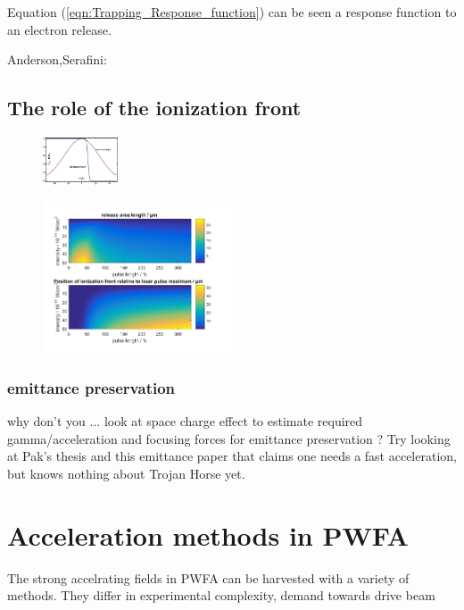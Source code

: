 Equation (\ref{eqn:Trapping_Response_function}) can be seen a response function to an electron release. 



Anderson,Serafini:\cite{AndersonVelocBunchPPRSTAB2005,serafini2001velocity}
\subsection{The role of the ionization front}

\begin{figure}
\includegraphics[width=0.2\textwidth]{theory/images/raw/Ionization_front.png}
\end{figure}


\begin{figure}
\begin{center}
\includegraphics[width=0.5\textwidth]{theory/images/edited/IonFrontVariation.pdf}
\end{center}
\end{figure}



\subsubsection{emittance preservation}
why don't you ... look at space charge effect to estimate required gamma/acceleration and focusing forces for emittance preservation ? Try looking at Pak's thesis and this emittance paper that claims one needs a fast acceleration, but knows nothing about Trojan Horse yet.
\section{Acceleration methods in PWFA}
The strong accelrating fields in PWFA can be harvested with a variety of methods. They differ in experimental complexity, demand towards drive beam 



